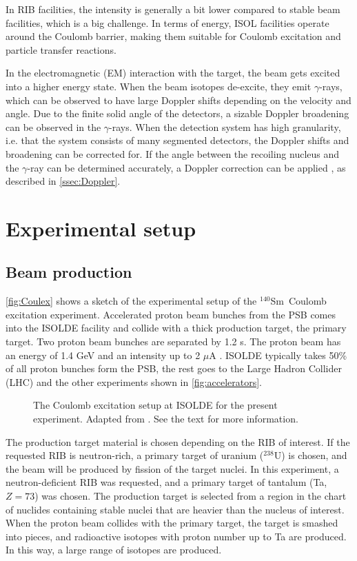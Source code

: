 \documentclass[twoside,english]{uiofysmaster/uiofysmaster}
\newcommand{\Sm}{$^{140}$Sm} %
\newcommand{\ga}{$\gamma$}
\let\orgautoref\autoref
\renewcommand{\autoref}
        {%
		 \def\sectionautorefname{Section}%
		 \def\subsectionautorefname{Section}%
		 \def\subsubsectionautorefname{Section}%
		 \def\chapterautorefname{Chapter}%
          \orgautoref}
\begin{document}
In RIB facilities, the intensity is generally a bit lower compared to stable beam facilities, which is a big challenge. 
In terms of energy, ISOL facilities operate around the Coulomb barrier, making them suitable for Coulomb excitation and particle transfer reactions. 

In the electromagnetic (EM) interaction with the target, the beam gets excited into a higher energy state.
When the beam isotopes de-excite, they emit \ga-rays, which can be observed to have large Doppler shifts depending on the velocity and angle.
Due to the finite solid angle of the detectors, a sizable Doppler broadening can be observed in the \ga-rays. 
When the detection system has high granularity, i.e. that the system consists of many segmented detectors, the Doppler shifts and broadening can be corrected for. 
If the angle between the recoiling nucleus and the \ga-ray can be determined accurately, a Doppler correction can be applied \cite{MB-spect}, as described in \autoref{ssec:Doppler}.


\section{Experimental setup}\label{sec:exp_setup}
\subsection{Beam production}\label{ssec:beam_prod}
\autoref{fig:Coulex} shows a sketch of the experimental setup of the \Sm\ Coulomb excitation experiment. 
Accelerated proton beam bunches from the PSB comes into the ISOLDE facility and collide with a thick production target, the primary target. 
Two proton beam bunches are separated by 1.2 s.
The proton beam has an energy of 1.4 GeV and an intensity up to 2 $\mu$A \cite{TIF, TIF2013}. 
ISOLDE typically takes 50\% \cite{MB-spect} of all proton bunches form the PSB, the rest goes to the Large Hadron Collider (LHC) and the other experiments shown in \autoref{fig:accelerators}. 

\begin{figure}[ht]
	\centering
	
	\caption{The Coulomb excitation setup at ISOLDE for the present experiment. 
	Adapted from \cite{Klintefjord}. 
	See the text for more information.}
	\label{fig:Coulex}
\end{figure}

The production target material is chosen depending on the RIB of interest. 
If the requested RIB is neutron-rich, a primary target of uranium ($^{238}$U) is chosen, and the beam will be produced by fission of the target nuclei.
In this experiment, a neutron-deficient RIB was requested, and a primary target of tantalum (Ta, $Z = 73$) was chosen.
The production target is selected from a region in the chart of nuclides containing stable nuclei that are heavier than the nucleus of interest.
When the proton beam collides with the primary target, the target is smashed into pieces, and radioactive isotopes with proton number up to Ta are produced.
In this way, a large range of isotopes are produced. 
\end{document}
